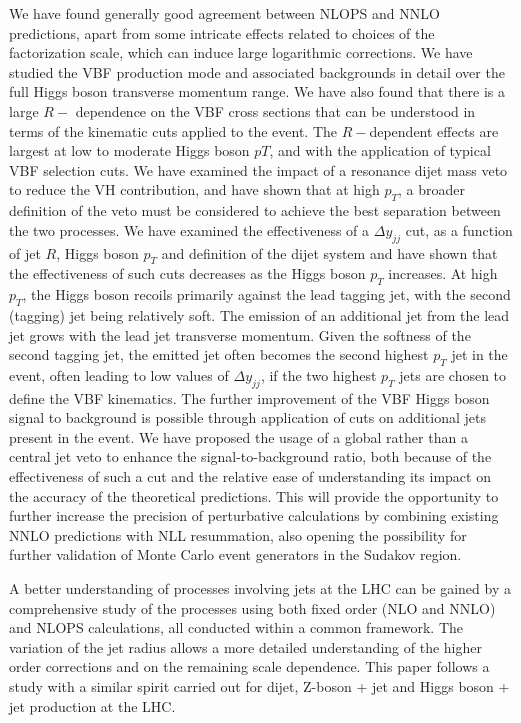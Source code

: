 \documentclass[10pt,prd,fleqn,superscriptaddress,notitlepage,nofootinbib,preprintnumbers,nobalancelastpage]{revtex4-1}
\newcommand{\VBF}{VBF\xspace}
\newcommand{\VH}{VH\xspace}
\begin{document}
We have found generally good agreement between NLOPS and NNLO predictions, apart from some intricate effects related to choices of the factorization scale, which can induce large logarithmic corrections.   We have studied the \VBF production mode and associated backgrounds in detail over the full Higgs boson transverse momentum range. We have also found that there is a large $R-$ dependence on the \VBF cross sections  that can be understood in terms of the kinematic  cuts applied to the event. The $R-$dependent effects are largest at low to moderate Higgs boson $pT$, and with the application of typical \VBF selection cuts.  We have examined the impact of a resonance dijet mass veto to reduce the \VH contribution, and have shown that at high $p_T$, a broader definition of the veto must be considered to achieve the best separation between the two processes. We have examined the effectiveness of a $\Delta y_{jj}$ cut, as a function of jet $R$, Higgs boson $p_T$ and definition of the dijet system and have shown that the effectiveness of such cuts decreases as the Higgs boson $p_T$ increases. At high $p_T$, the Higgs boson recoils primarily against the lead tagging jet, with the second (tagging) jet being relatively soft. The emission of an additional jet from the lead jet grows with the lead jet transverse momentum. Given the softness of the second tagging jet, the emitted jet often becomes the second highest $p_T$ jet in the event, often leading to low values of $\Delta y_{jj}$, if the two highest $p_T$ jets are chosen to define the \VBF kinematics.  The further improvement of the \VBF Higgs boson signal to background is possible through application of cuts on additional jets present in the event. We  have proposed the usage of a global rather than a central jet veto to enhance the signal-to-background ratio, both because of the effectiveness of such a cut and the relative ease of understanding its impact on the accuracy of the theoretical predictions. This will provide the opportunity to further increase the  precision of perturbative calculations by combining existing NNLO predictions with NLL resummation, also opening the possibility for further validation of Monte Carlo event generators in the Sudakov region.

A better understanding of processes involving jets at the LHC can be gained by a comprehensive study of the processes using both fixed order (NLO and NNLO) and NLOPS calculations, all conducted within a common framework. The variation of the jet radius allows a more detailed understanding of the higher order corrections and on the remaining scale dependence. This paper follows a study with a similar spirit carried out for dijet, Z-boson + jet and Higgs boson + jet production at the LHC.
\end{document}
